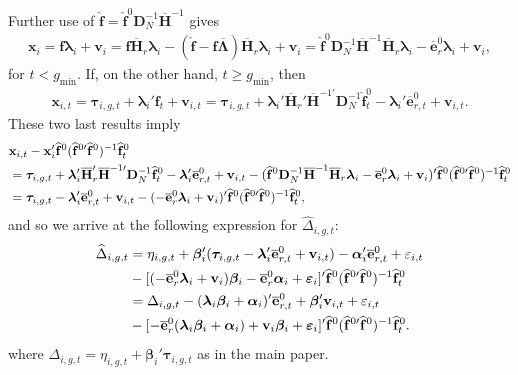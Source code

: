 \documentclass[12pt,fleqn]{article}
\def\*#1{\mathbf{#1}}
\def\+#1{\boldsymbol{#1}}
\begin{document}
Further use of $\widehat{\*f} = \widehat{\*f}^0\*D_{N}^{-1}\overline{\*H}^{-1}$ gives
\begin{eqnarray}
\*x_i = \*f\+\lambda_i + \*v_i = \widehat{\*f}\overline{\*H}_{r}\+\lambda_i -  (\widehat{\*f} - \*f\overline{\+\Lambda})\overline{\*H}_{r}\+\lambda_i  + \*v_i =  \widehat{\*f}^0\*D_{N}^{-1}\overline{\*H}^{-1}\overline{\*H}_{r}\+\lambda_i  - \overline{\*e}_{r}^0\+\lambda_i  + \*v_i ,
\end{eqnarray}
for $t< g_{\min}$. If, on the other hand, $t \geq g_{\min}$, then
\begin{eqnarray}
\*x_{i,t} = \+\tau_{i,g,t} + \+\lambda_i'\*f_t + \*v_{i,t} =  \+\tau_{i,g,t} + \+\lambda_i' \overline{\*H}_{r}'\overline{\*H}^{-1\prime}\*D_{N}^{-1}\widehat{\*f}_t^0  - \+\lambda_i'\overline{\*e}_{r,t}^0  + \*v_{i,t}.
\end{eqnarray}
These two last results imply
\begin{align}
& \*x_{i,t} -  \*x_{i}' \widehat{\*f}^{0}(\widehat{\*f}^{0\prime}\widehat{\*f}^0)^{-1}\widehat{\*f}_t^0 \notag\\
& = \+\tau_{i,g,t} + \+\lambda_i' \overline{\*H}_{r}'\overline{\*H}^{-1\prime}\*D_{N}^{-1}\widehat{\*f}_t^0  - \+\lambda_i'\overline{\*e}_{r,t}^0  + \*v_{i,t} -  (\widehat{\*f}^0\*D_{N}^{-1}\overline{\*H}^{-1}\overline{\*H}_{r}\+\lambda_i  - \overline{\*e}_{r}^0\+\lambda_i  + \*v_i)' \widehat{\*f}^{0}(\widehat{\*f}^{0\prime}\widehat{\*f}^0)^{-1}\widehat{\*f}_t^0\notag\\
& = \+\tau_{i,g,t}  - \+\lambda_i'\overline{\*e}_{r,t}^0  + \*v_{i,t} -  ( - \overline{\*e}_{r}^0\+\lambda_i  + \*v_i)' \widehat{\*f}^{0}(\widehat{\*f}^{0\prime}\widehat{\*f}^0)^{-1}\widehat{\*f}_t^0,
\end{align}
and so we arrive at the following expression for $\widehat \Delta_{i,g,t}$:
\begin{align}
\widehat \Delta_{i,g,t} & = \eta_{i,g,t} + \+\beta_i'(\+\tau_{i,g,t}  - \+\lambda_i'\overline{\*e}_{r,t}^0  + \*v_{i,t}) - \+\alpha_i'\overline{\*e}_{r,t}^0 + \varepsilon_{i,t}\notag\\
& - [ (- \overline{\*e}_{r}^0\+\lambda_i  + \*v_i)\+\beta_i  - \overline{\*e}_{r}^0\+\alpha_i +  \+\varepsilon_{i} ]' \widehat{\*f}^{0} (\widehat{\*f}^{0\prime}\widehat{\*f}^0)^{-1}\widehat{\*f}_t^0 \notag\\
& = \Delta_{i,g,t} - (\+\lambda_i\+\beta_i + \+\alpha_i)'\overline{\*e}_{r,t}^0 + \+\beta_i'\*v_{i,t} + \varepsilon_{i,t} \notag\\
& - [ - \overline{\*e}_{r}^0(\+\lambda_i\+\beta_i +\+\alpha_i) + \*v_i\+\beta_i+  \+\varepsilon_{i} ]' \widehat{\*f}^{0} (\widehat{\*f}^{0\prime}\widehat{\*f}^0)^{-1}\widehat{\*f}_t^0  .
\end{align}
where $\Delta_{i,g,t} = \eta_{i,g,t} + \+\beta_i'\+\tau_{i,g,t}$ as in the main paper.
\end{document}
